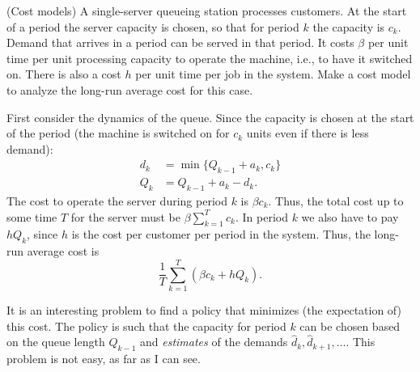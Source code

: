 \begin{exercise}(Cost models) A single-server queueing station
  processes customers. At the start of a period the server capacity is
  chosen, so that for period $k$ the capacity is $c_k$. Demand that
  arrives in a period can be served in that period. It costs $\beta$
  per unit time per unit processing capacity to operate the machine,
  i.e., to have it switched on. There is also a cost $h$ per unit time
  per job in the system. Make a cost model to analyze the long-run
  average cost for this case.
  \begin{solution}
First consider the dynamics of the queue. Since the capacity is chosen at the start of the period (the machine is switched on for $c_k$ units even if there is less demand):
\begin{align*}
  d_k &= \min\{Q_{k-1}+a_k, c_k\} \\
Q_k &= Q_{k-1}+a_k - d_k.
\end{align*}
The cost to operate the server during period $k$ is $\beta c_k$.
Thus, the total cost up to some time $T$ for the server must be
$\beta \sum_{k=1}^T c_k$. In period $k$ we also have to pay $h Q_k$,
since $h$ is the cost per customer per period in the system. Thus, the
long-run average cost is
    \begin{equation*}
      \frac 1T\sum_{k=1}^T \left(\beta c_k + h Q_k\right).
    \end{equation*}

    It is an interesting problem to find a policy that minimizes (the
    expectation of) this cost. The policy is such that the capacity
    for period $k$ can be chosen based on the queue length $Q_{k-1}$
    and \emph{estimates} of the demands
    $\hat d_k, \hat d_{k+1}, \ldots$. This problem is not easy, as far as I can see. 

  \end{solution}
\end{exercise}


